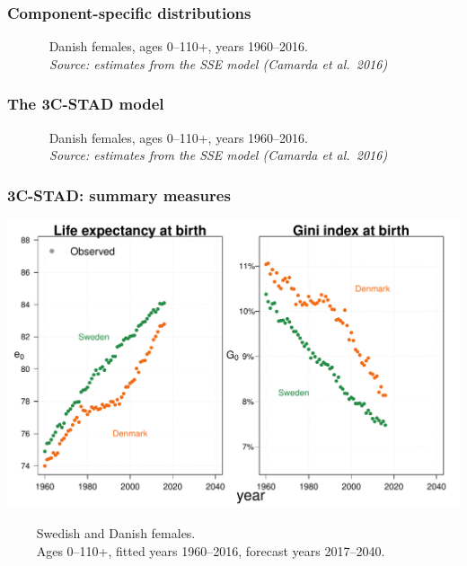 \documentclass[12pt, xcolor=table]{beamer}  %
\begin{document}
\begin{frame}\frametitle{Component-specific distributions}
	\begin{center}
	\end{center}
	\vspace{-0.2cm}
	\tiny{$\quad\quad\quad$ Danish females, ages 0--110+, years 1960--2016. \\ \emph{$\quad\quad\quad$ Source: estimates from the SSE model (Camarda et al.~2016)}}
\end{frame}

\begin{frame}\frametitle{The 3C-STAD model}
	\begin{center}
	\end{center}
	\vspace{-0.2cm}
	\tiny{$\quad\quad\quad$ Danish females, ages 0--110+, years 1960--2016. \\ \emph{$\quad\quad\quad$ Source: estimates from the SSE model (Camarda et al.~2016)}}
\end{frame}

\begin{frame}\frametitle{3C-STAD: summary measures}

\vspace{-0.5cm}
	
	
	\begin{center}	
		\vspace{0.4cm}
		
		\includegraphics[scale=.42]{Figures/Ch3/F4_1}
		
	\end{center}
	
\vspace{-0.3cm}
\tiny{$\quad\quad$ Swedish and Danish females. \\ $\quad\quad$ Ages 0--110+, fitted years 1960--2016, forecast years 2017--2040.}	
	
\end{frame}
\end{document}
